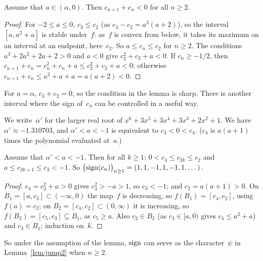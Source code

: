 \begin{lemma}
  \label{lem:sumsign}
  \leanok
  Assume that $a \in (\alpha, 0)$. Then $c_{n+1} + c_n < 0$ for all $n \ge 2$.
\end{lemma}
\begin{proof}
  \leanok
  For $-2 \le a \le 0$, $c_3 \le c_2$ (as $c_3 - c_2 = a^3(a + 2)$), so the interval
  $[a, a^2 + a]$ is stable under~$f$: as~$f$ is convex from below, it takes its maximum on an
  interval at an endpoint, here~$c_2$. So $a \le c_n \le c_2$ for $n \ge 2$. The conditions
  $a^3 + 2a^2 + 2a + 2 > 0$ and $a < 0$ give $c_2^2 + c_2 + a < 0$. If $c_n \ge -1/2$, then
  $c_{n+1} + c_n = c_n^2 + c_n + a \le c_2^2 + c_2 + a < 0$; otherwise
  $c_{n+1} + c_n \le a^2 + a + a = a(a + 2) < 0$.
\end{proof}

For $a = \alpha$, $c_3 + c_2 = 0$, so the condition in the lemma is sharp. There is another
interval where the sign of~$c_n$ can be controlled in a useful way.

\begin{definition}
  \label{def:alphaprime}
  \leanok
  We write~$\alpha'$ for the larger real root of $x^6 + 3x^5 + 3x^4 + 3x^3 + 2x^2 + 1$. We have
  $\alpha' \approx -1.310703$, and $\alpha' < a < -1$ is equivalent to $c_3 < 0 < c_4$. ($c_4$
  is $a(a + 1)$ times the polynomial evaluated at~$a$.)
\end{definition}

\begin{lemma}
  \label{lem:window}
  \leanok
  Assume that $\alpha' < a < -1$. Then for all $k \ge 1$: $0 < c_4 \le c_{2k} \le c_2$ and
  $a \le c_{2k+1} \le c_3 < -1$. So $\bigl(\operatorname{sign}(c_n)\bigr)_{n \ge 1} = (1, 1, -1, 1, -1, 1,
  \dots)$.
\end{lemma}
\begin{proof}
  \leanok
  $c_4 = c_3^2 + a > 0$ gives $c_3^2 > -a > 1$, so $c_3 < -1$; and $c_2 = a(a+1) > 0$. On
  $B_1 = [a, c_3] \subset (-\infty, 0)$ the map~$f$ is decreasing, so $f(B_1) = [c_4, c_2]$, using
  $f(a) = c_2$; on $B_2 = [c_4, c_2] \subset (0, \infty)$ it is increasing, so
  $f(B_2) = [c_5, c_3] \subseteq B_1$, as $c_5 \ge a$. Also $c_2 \in B_2$ (as $c_3 \in [a, 0)$
  gives $c_4 \le a^2 + a$) and $c_3 \in B_1$; induction on~$k$.
\end{proof}

So under the assumption of the lemma, $\operatorname{sign}$ can serve as the character~$\psi$ in
Lemma~\ref{lem:jump2} when $n \ge 2$.
